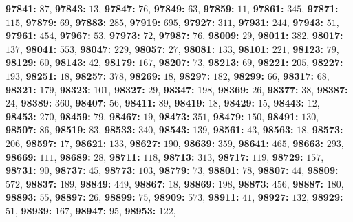 \textsf{\bfseries 97841:} $87$, \textsf{\bfseries 97843:} $13$, \textsf{\bfseries 97847:} $76$, \textsf{\bfseries 97849:} $63$, \textsf{\bfseries 97859:} $11$, \textsf{\bfseries 97861:} $345$, \textsf{\bfseries 97871:} $115$, \textsf{\bfseries 97879:} $69$, \textsf{\bfseries 97883:} $285$, \textsf{\bfseries 97919:} $695$, \textsf{\bfseries 97927:} $311$, \textsf{\bfseries 97931:} $244$, \textsf{\bfseries 97943:} $51$, \textsf{\bfseries 97961:} $454$, \textsf{\bfseries 97967:} $53$, \textsf{\bfseries 97973:} $72$, \textsf{\bfseries 97987:} $76$, \textsf{\bfseries 98009:} $29$, \textsf{\bfseries 98011:} $382$, \textsf{\bfseries 98017:} $137$, \textsf{\bfseries 98041:} $553$, \textsf{\bfseries 98047:} $229$, \textsf{\bfseries 98057:} $27$, \textsf{\bfseries 98081:} $133$, \textsf{\bfseries 98101:} $221$, \textsf{\bfseries 98123:} $79$, \textsf{\bfseries 98129:} $60$, \textsf{\bfseries 98143:} $42$, \textsf{\bfseries 98179:} $167$, \textsf{\bfseries 98207:} $73$, \textsf{\bfseries 98213:} $69$, \textsf{\bfseries 98221:} $205$, \textsf{\bfseries 98227:} $193$, \textsf{\bfseries 98251:} $18$, \textsf{\bfseries 98257:} $378$, \textsf{\bfseries 98269:} $18$, \textsf{\bfseries 98297:} $182$, \textsf{\bfseries 98299:} $66$, \textsf{\bfseries 98317:} $68$, \textsf{\bfseries 98321:} $179$, \textsf{\bfseries 98323:} $101$, \textsf{\bfseries 98327:} $29$, \textsf{\bfseries 98347:} $198$, \textsf{\bfseries 98369:} $26$, \textsf{\bfseries 98377:} $38$, \textsf{\bfseries 98387:} $24$, \textsf{\bfseries 98389:} $360$, \textsf{\bfseries 98407:} $56$, \textsf{\bfseries 98411:} $89$, \textsf{\bfseries 98419:} $18$, \textsf{\bfseries 98429:} $15$, \textsf{\bfseries 98443:} $12$, \textsf{\bfseries 98453:} $270$, \textsf{\bfseries 98459:} $79$, \textsf{\bfseries 98467:} $19$, \textsf{\bfseries 98473:} $351$, \textsf{\bfseries 98479:} $150$, \textsf{\bfseries 98491:} $130$, \textsf{\bfseries 98507:} $86$, \textsf{\bfseries 98519:} $83$, \textsf{\bfseries 98533:} $340$, \textsf{\bfseries 98543:} $139$, \textsf{\bfseries 98561:} $43$, \textsf{\bfseries 98563:} $18$, \textsf{\bfseries 98573:} $206$, \textsf{\bfseries 98597:} $17$, \textsf{\bfseries 98621:} $133$, \textsf{\bfseries 98627:} $190$, \textsf{\bfseries 98639:} $359$, \textsf{\bfseries 98641:} $465$, \textsf{\bfseries 98663:} $293$, \textsf{\bfseries 98669:} $111$, \textsf{\bfseries 98689:} $28$, \textsf{\bfseries 98711:} $118$, \textsf{\bfseries 98713:} $313$, \textsf{\bfseries 98717:} $119$, \textsf{\bfseries 98729:} $157$, \textsf{\bfseries 98731:} $90$, \textsf{\bfseries 98737:} $45$, \textsf{\bfseries 98773:} $103$, \textsf{\bfseries 98779:} $73$, \textsf{\bfseries 98801:} $78$, \textsf{\bfseries 98807:} $44$, \textsf{\bfseries 98809:} $572$, \textsf{\bfseries 98837:} $189$, \textsf{\bfseries 98849:} $449$, \textsf{\bfseries 98867:} $18$, \textsf{\bfseries 98869:} $198$, \textsf{\bfseries 98873:} $456$, \textsf{\bfseries 98887:} $180$, \textsf{\bfseries 98893:} $55$, \textsf{\bfseries 98897:} $26$, \textsf{\bfseries 98899:} $75$, \textsf{\bfseries 98909:} $573$, \textsf{\bfseries 98911:} $41$, \textsf{\bfseries 98927:} $132$, \textsf{\bfseries 98929:} $51$, \textsf{\bfseries 98939:} $167$, \textsf{\bfseries 98947:} $95$, \textsf{\bfseries 98953:} $122$, 
